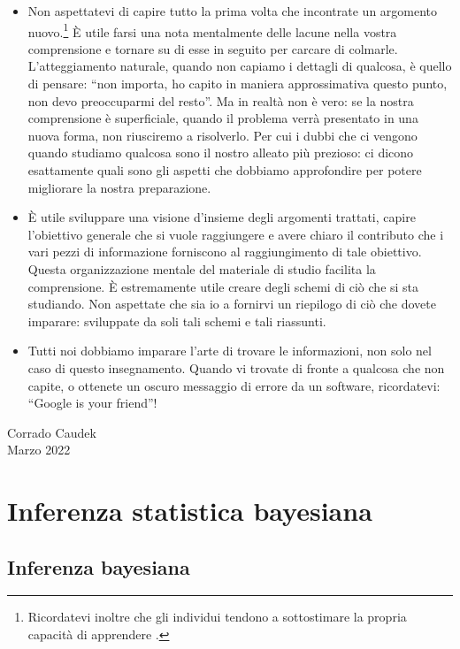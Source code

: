 \documentclass[
  11pt,
]{krantz}
\theoremstyle{definition}
\theoremstyle{definition}
\theoremstyle{definition}
\theoremstyle{definition}
\theoremstyle{remark}
\begin{document}
\begin{itemize}
\item
  Non aspettatevi di capire tutto la prima volta che incontrate un argomento nuovo.\footnote{Ricordatevi inoltre che gli individui tendono a sottostimare la propria capacità di apprendere \citep{horn2021underestimating}.} È utile farsi una nota mentalmente delle lacune nella vostra comprensione e tornare su di esse in seguito per carcare di colmarle. L'atteggiamento naturale, quando non capiamo i dettagli di qualcosa, è quello di pensare: ``non importa, ho capito in maniera approssimativa questo punto, non devo preoccuparmi del resto''. Ma in realtà non è vero: se la nostra comprensione è superficiale, quando il problema verrà presentato in una nuova forma, non riusciremo a risolverlo. Per cui i dubbi che ci vengono quando studiamo qualcosa sono il nostro alleato più prezioso: ci dicono esattamente quali sono gli aspetti che dobbiamo approfondire per potere migliorare la nostra preparazione.
\item
  È utile sviluppare una visione d'insieme degli argomenti trattati, capire l'obiettivo generale che si vuole raggiungere e avere chiaro il contributo che i vari pezzi di informazione forniscono al raggiungimento di tale obiettivo. Questa organizzazione mentale del materiale di studio facilita la comprensione. È estremamente utile creare degli schemi di ciò che si sta studiando. Non aspettate che sia io a fornirvi un riepilogo di ciò che dovete imparare: sviluppate da soli tali schemi e tali riassunti.
\item
  Tutti noi dobbiamo imparare l'arte di trovare le informazioni, non solo nel caso di questo insegnamento. Quando vi trovate di fronte a qualcosa che non capite, o ottenete un oscuro messaggio di errore da un software, ricordatevi: ``Google is your friend''!
\end{itemize}

\begin{flushright}
Corrado Caudek\\
Marzo 2022 \end{flushright}

\mainmatter

\hypertarget{part-inferenza-statistica-bayesiana}{%
\part*{Inferenza statistica bayesiana}\label{part-inferenza-statistica-bayesiana}}


\hypertarget{ch:intro-bayes-inference}{%
\chapter{Inferenza bayesiana}\label{ch:intro-bayes-inference}}
\end{document}
